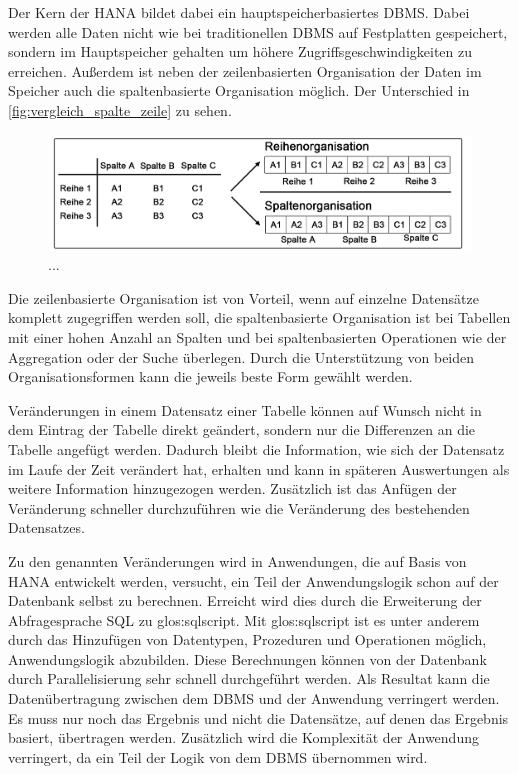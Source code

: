 \begin{onehalfspacing}
Der Kern der \gls{HANA} bildet dabei ein hauptspeicherbasiertes \gls{DBMS}. Dabei werden alle Daten nicht wie bei traditionellen \gls{DBMS} auf Festplatten gespeichert, sondern im Hauptspeicher gehalten um höhere Zugriffsgeschwindigkeiten zu erreichen. Außerdem ist neben der zeilenbasierten Organisation der Daten im Speicher auch die spaltenbasierte Organisation möglich. Der Unterschied in \vref{fig:vergleich_spalte_zeile} zu sehen. 

\begin{figure}[h]
\centering
\setlength{\unitlength}{1mm}
\includegraphics[width=15cm]{images/in-memory-row-column.png}
\caption{...\label{fig:vergleich_spalte_zeile}}
\end{figure} 

Die zeilenbasierte Organisation ist von Vorteil, wenn auf einzelne Datensätze komplett zugegriffen werden soll, die spaltenbasierte Organisation ist bei Tabellen mit einer hohen Anzahl an Spalten und bei spaltenbasierten Operationen wie der Aggregation oder der Suche überlegen. Durch die Unterstützung von beiden Organisationsformen kann die jeweils beste Form gewählt werden.

Veränderungen in einem Datensatz einer Tabelle können auf Wunsch nicht in dem Eintrag der Tabelle direkt geändert, sondern nur die Differenzen an die Tabelle angefügt werden. Dadurch bleibt die Information, wie sich der Datensatz im Laufe der Zeit verändert hat, erhalten und kann in späteren Auswertungen als weitere Information hinzugezogen werden. Zusätzlich ist das Anfügen der Veränderung schneller durchzuführen wie die Veränderung des bestehenden Datensatzes.

Zu den genannten Veränderungen wird in Anwendungen, die auf Basis von \gls{HANA} entwickelt werden, versucht, ein Teil der Anwendungslogik schon auf der Datenbank selbst zu berechnen. Erreicht wird dies durch die Erweiterung der Abfragesprache \gls{SQL} zu \gls{glos:sqlscript}. Mit \gls{glos:sqlscript} ist es unter anderem durch das Hinzufügen von Datentypen, Prozeduren und Operationen möglich, Anwendungslogik abzubilden. Diese Berechnungen können von der Datenbank durch Parallelisierung sehr schnell durchgeführt werden. Als Resultat kann die Datenübertragung zwischen dem \gls{DBMS} und der Anwendung verringert werden. Es muss nur noch das Ergebnis und nicht die Datensätze, auf denen das Ergebnis basiert, übertragen werden. Zusätzlich wird die Komplexität der Anwendung verringert, da ein Teil der Logik von dem \gls{DBMS} übernommen wird.


\end{onehalfspacing}
